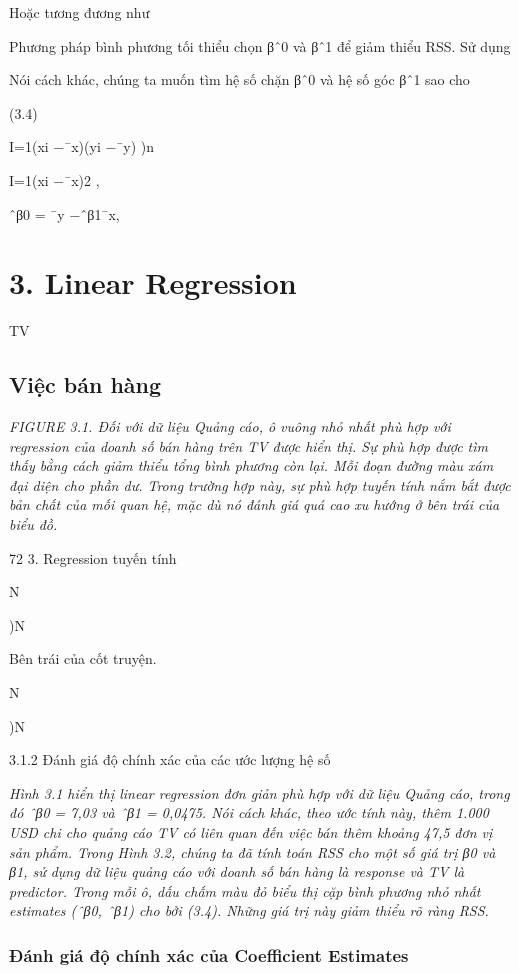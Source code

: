 Hoặc tương đương như

Phương pháp bình phương tối thiểu chọn βˆ0 và βˆ1 để giảm thiểu RSS. Sử dụng

Nói cách khác, chúng ta muốn tìm hệ số chặn βˆ0 và hệ số góc βˆ1 sao cho

(3.4)

I=1(xi −¯x)(yi −¯y) )n

I=1(xi −¯x)2 ,

ˆβ0 = ¯y −ˆβ1¯x,

\section{3. Linear Regression}

TV

\subsection{Việc bán hàng}

\noindent\textit{FIGURE 3.1. Đối với dữ liệu Quảng cáo, ô vuông nhỏ nhất phù hợp với regression của doanh số bán hàng trên TV được hiển thị. Sự phù hợp được tìm thấy bằng cách giảm thiểu tổng bình phương còn lại. Mỗi đoạn đường màu xám đại diện cho phần dư. Trong trường hợp này, sự phù hợp tuyến tính nắm bắt được bản chất của mối quan hệ, mặc dù nó đánh giá quá cao xu hướng ở bên trái của biểu đồ.}

72 3. Regression tuyến tính

N

)N

Bên trái của cốt truyện.

N

)N

3.1.2 Đánh giá độ chính xác của các ước lượng hệ số

\noindent\textit{Hình 3.1 hiển thị linear regression đơn giản phù hợp với dữ liệu Quảng cáo, trong đó ˆβ0 = 7,03 và ˆβ1 = 0,0475. Nói cách khác, theo ước tính này, thêm 1.000 USD chi cho quảng cáo TV có liên quan đến việc bán thêm khoảng 47,5 đơn vị sản phẩm. Trong Hình 3.2, chúng ta đã tính toán RSS cho một số giá trị β0 và β1, sử dụng dữ liệu quảng cáo với doanh số bán hàng là response và TV là predictor. Trong mỗi ô, dấu chấm màu đỏ biểu thị cặp bình phương nhỏ nhất estimates (ˆβ0, ˆβ1) cho bởi (3.4). Những giá trị này giảm thiểu rõ ràng RSS.}

\subsubsection{Đánh giá độ chính xác của Coefficient Estimates}

